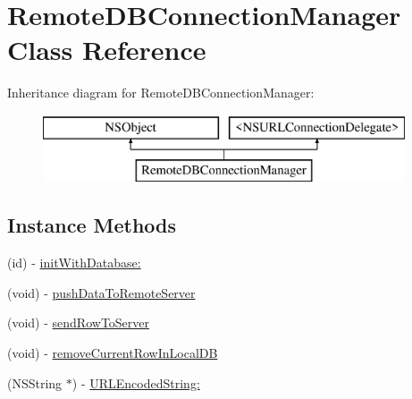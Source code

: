 \hypertarget{interface_remote_d_b_connection_manager}{\section{Remote\-D\-B\-Connection\-Manager Class Reference}
\label{interface_remote_d_b_connection_manager}
}
Inheritance diagram for Remote\-D\-B\-Connection\-Manager\-:\begin{figure}[H]
\begin{center}
\leavevmode
\includegraphics[height=2.000000cm]{interface_remote_d_b_connection_manager}
\end{center}
\end{figure}
\subsection*{Instance Methods}
\begin{DoxyCompactItemize}
\item 
(id) -\/ \hyperlink{interface_remote_d_b_connection_manager_a744cbe8cedf02655ce5a2311957059cb}{init\-With\-Database\-:}
\item 
(void) -\/ \hyperlink{interface_remote_d_b_connection_manager_a517a86ad693e383d664972123808b9fc}{push\-Data\-To\-Remote\-Server}
\item 
(void) -\/ \hyperlink{interface_remote_d_b_connection_manager_aa7263ee167de6993f3c68d74f34d3b9e}{send\-Row\-To\-Server}
\item 
(void) -\/ \hyperlink{interface_remote_d_b_connection_manager_a87140c7af270366183486e2f02dc6f5d}{remove\-Current\-Row\-In\-Local\-D\-B}
\item 
(N\-S\-String $\ast$) -\/ \hyperlink{interface_remote_d_b_connection_manager_a56943f27947c97c9c0d88bf3f89a73f6}{U\-R\-L\-Encoded\-String\-:}
\end{DoxyCompactItemize}

